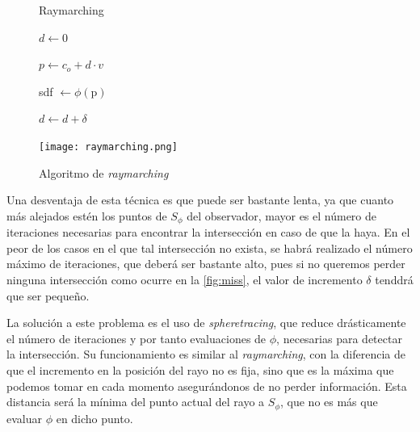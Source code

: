 \begin{figure}[ht!]
    \centering
    \begin{minipage}{0.50\textwidth}
        \begin{algorithm}[H]
            \caption{Raymarching}
                
                $d \gets 0$ 
                
                 {
                    $p \gets c_o +d\cdot v$
                    
                    sdf $\gets \phi(\text{p})$
                    
            
                    $d\gets d + \delta$\;
            
                }
        \end{algorithm}
    \end{minipage}%
    \hfill
    \begin{minipage}{0.48\textwidth}
        \texttt{[image: raymarching.png]}
    \end{minipage}
    \caption{Algoritmo de \textit{raymarching}}
    \label{a:raymarching}
\end{figure}

Una desventaja de esta técnica es que puede ser bastante lenta, ya que cuanto más alejados estén los puntos de $S_\phi$ del observador, mayor es el número de iteraciones necesarias para encontrar la intersección en caso de que la haya. En el peor de los casos en el que tal intersección no exista, se habrá realizado el número máximo de iteraciones, que deberá ser bastante alto, pues si no queremos perder ninguna intersección como ocurre en la \autoref{fig:miss}, el valor de incremento $\delta$ tenddrá que ser pequeño.\newline

La solución a este problema es el uso de \textit{spheretracing}, que reduce drásticamente el número de iteraciones y por tanto evaluaciones de $\phi$, necesarias para detectar la intersección. Su funcionamiento es similar al \textit{raymarching}, con la diferencia de que el incremento en la posición del rayo no es fija, sino que es la máxima que podemos tomar en cada momento asegurándonos de no perder información. Esta distancia será la mínima del punto actual del rayo a $S_\phi$, que no es más que evaluar $\phi$ en dicho punto.\newline

